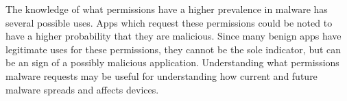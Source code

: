 \documentclass{llncs}
\begin{document}

The knowledge of what permissions have a higher prevalence in malware has several possible uses. Apps which request these permissions could be noted to have a higher probability that they are malicious. Since many benign apps have legitimate uses for these permissions, they cannot be the sole indicator, but can be an sign of a possibly malicious application. Understanding what permissions malware requests may be useful for understanding how current and future malware spreads and affects devices.

\end{document}
